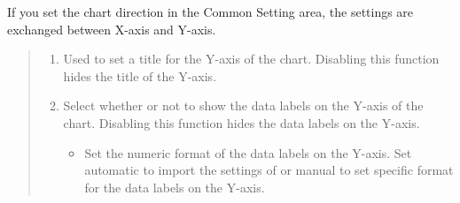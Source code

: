 \documentclass[letterpaper,10pt,english]{sphinxmanual}
\begin{document}
If you set the chart direction  in the Common Setting area, the settings are exchanged between X-axis and Y-axis.
\begin{quote}

\begin{figure}[H]
\centering

\noindent{}
\end{figure}
\begin{enumerate}
\def\theenumi{\arabic{enumi}}
\def\labelenumi{\theenumi .}
\makeatletter\def\p@enumii{\p@enumi \theenumi .}\makeatother
\item {} 
 Used to set a title for the Y-axis of the chart. Disabling this function hides the title of the Y-axis.

\item {} 
 Select whether or not to show the data labels on the Y-axis of the chart. Disabling this function hides the data labels on the Y-axis.
\begin{itemize}
\item {} 
 Set the numeric format of the data labels on the Y-axis. Set automatic to import the settings of  or manual to set specific format for the data labels on the Y-axis.

\end{itemize}

\end{enumerate}
\end{quote}

\end{document}
